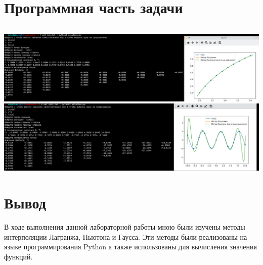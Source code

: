 \section{Программная часть задачи}
\inputminted[breaklines]{Python}{../solution/solution.py}

\begin{center}
\includegraphics[width=\textwidth]{img/demo1.png}
\includegraphics[width=\textwidth]{img/demo2.png}
\end{center}

\section{Вывод}
В ходе выполнения данной лабораторной работы мною были изучены
методы интерполяции Лагранжа, Ньютона и Гаусса.
Эти методы были реализованы на языке программирования Python
а также использованы для вычисления значения функций.
